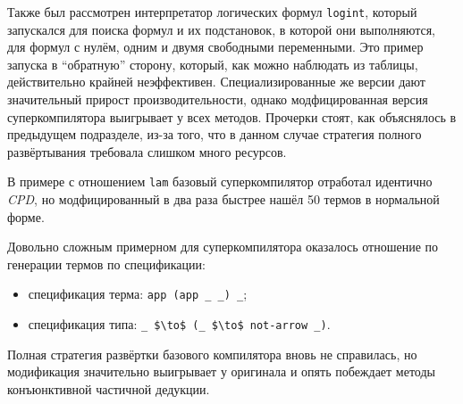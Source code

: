 Также был рассмотрен интерпретатор логических формул \lstinline{logint}, который
запускался для поиска формул и их подстановок, в которой они выполняются, для
формул с нулём, одним и двумя свободными переменными. Это пример запуска в ``обратную''
сторону, который, как можно наблюдать из таблицы, действительно крайней неэффективен.
Специализированные же версии дают значительный прирост производительности, однако
модфицированная версия суперкомпилятора выигрывает у всех методов. Прочерки стоят,
как объяснялось в предыдущем подразделе, из-за того, что в данном случае стратегия
полного развёртывания требовала слишком много ресурсов.

В примере с отношением \lstinline{lam} базовый суперкомпилятор отработал
идентично \textit{CPD}, но модфицированный в два раза быстрее нашёл 50 термов
в нормальной форме.

Довольно сложным примерном для суперкомпилятора оказалось отношение
по генерации термов по спецификации:
\begin{itemize}
\item спецификация терма: \lstinline{app (app _ _) _};
\item спецификация типа: \lstinline{_ $\to$ (_ $\to$ not-arrow _)}.
\end{itemize}
Полная стратегия развёртки базового компилятора вновь не справилась,
но модификация значительно выигрывает у оригинала и опять побеждает методы
конъюнктивной частичной дедукции.\\


